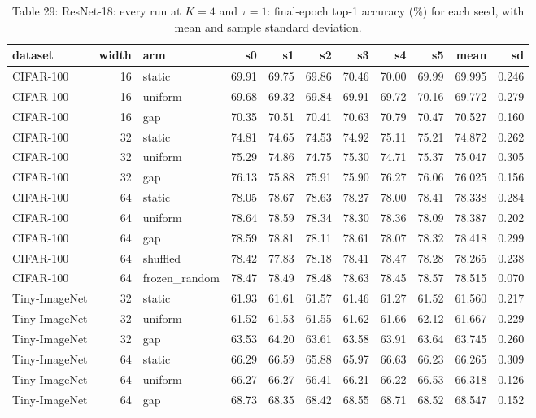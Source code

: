 \documentclass{article}
\begin{document}
\begin{table}
\caption{Table 29: ResNet-18: every run at $K=4$ and $\tau=1$: final-epoch top-1 accuracy
(\%) for each seed, with mean and sample standard deviation.}

\begin{tabular}{l r l rrrrrr rr}
\toprule
dataset & width & arm & s0 & s1 & s2 & s3 & s4 & s5 & mean & sd \\
\midrule
CIFAR‑100 & 16 & static & 69.91 & 69.75 & 69.86 & 70.46 & 70.00 & 69.99 & 69.995 & 0.246 \\
CIFAR‑100 & 16 & uniform & 69.68 & 69.32 & 69.84 & 69.91 & 69.72 & 70.16 & 69.772 & 0.279 \\
CIFAR‑100 & 16 & gap & 70.35 & 70.51 & 70.41 & 70.63 & 70.79 & 70.47 & 70.527 & 0.160 \\
CIFAR‑100 & 32 & static & 74.81 & 74.65 & 74.53 & 74.92 & 75.11 & 75.21 & 74.872 & 0.262 \\
CIFAR‑100 & 32 & uniform & 75.29 & 74.86 & 74.75 & 75.30 & 74.71 & 75.37 & 75.047 & 0.305 \\
CIFAR‑100 & 32 & gap & 76.13 & 75.88 & 75.91 & 75.90 & 76.27 & 76.06 & 76.025 & 0.156 \\
CIFAR‑100 & 64 & static & 78.05 & 78.67 & 78.63 & 78.27 & 78.00 & 78.41 & 78.338 & 0.284 \\
CIFAR‑100 & 64 & uniform & 78.64 & 78.59 & 78.34 & 78.30 & 78.36 & 78.09 & 78.387 & 0.202 \\
CIFAR‑100 & 64 & gap & 78.59 & 78.81 & 78.11 & 78.61 & 78.07 & 78.32 & 78.418 & 0.299 \\
CIFAR‑100 & 64 & shuffled & 78.42 & 77.83 & 78.18 & 78.41 & 78.47 & 78.28 & 78.265 & 0.238 \\
CIFAR‑100 & 64 & frozen\_random & 78.47 & 78.49 & 78.48 & 78.63 & 78.45 & 78.57 & 78.515 & 0.070 \\
Tiny‑ImageNet & 32 & static & 61.93 & 61.61 & 61.57 & 61.46 & 61.27 & 61.52 & 61.560 & 0.217 \\
Tiny‑ImageNet & 32 & uniform & 61.52 & 61.53 & 61.55 & 61.62 & 61.66 & 62.12 & 61.667 & 0.229 \\
Tiny‑ImageNet & 32 & gap & 63.53 & 64.20 & 63.61 & 63.58 & 63.91 & 63.64 & 63.745 & 0.260 \\
Tiny‑ImageNet & 64 & static & 66.29 & 66.59 & 65.88 & 65.97 & 66.63 & 66.23 & 66.265 & 0.309 \\
Tiny‑ImageNet & 64 & uniform & 66.27 & 66.27 & 66.41 & 66.21 & 66.22 & 66.53 & 66.318 & 0.126 \\
Tiny‑ImageNet & 64 & gap & 68.73 & 68.35 & 68.42 & 68.55 & 68.71 & 68.52 & 68.547 & 0.152 \\
\bottomrule
\end{tabular}
\end{table}
\end{document}
